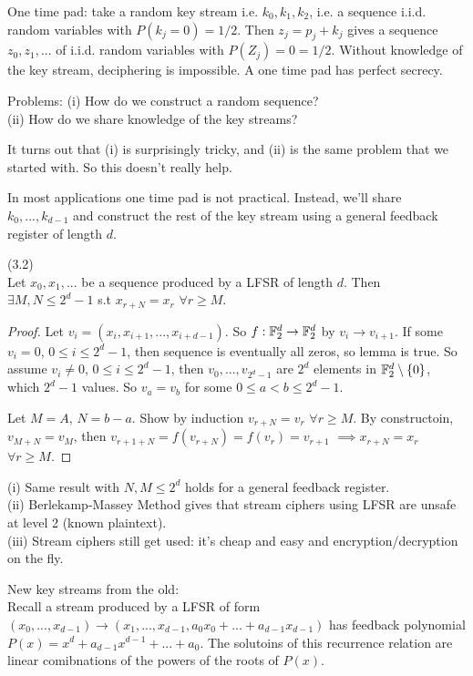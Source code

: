 \documentclass[a4paper]{article}
\begin{document}
One time pad: take a random key stream i.e. $k_0,k_1,k_2$, i.e. a sequence i.i.d. random variables with $P(k_j=0) = 1/2$. Then $z_j = p_j + k_j$ gives a sequence $z_0,z_1,...$ of i.i.d. random variables with $P(Z_j) = 0 = 1/2$. Without knowledge of the key stream, deciphering is impossible. A one time pad has perfect secrecy.

Problems: (i) How do we construct a random sequence?\\
(ii) How do we share knowledge of the key streams?

It turns out that (i) is surprisingly tricky, and (ii) is the same problem that we started with. So this doesn't really help.

In most applications one time pad is not practical. Instead, we'll share $k_0,...,k_{d-1}$ and construct the rest of the key stream using a general feedback register of length $d$.

\begin{lemma} (3.2)\\
Let $x_0,x_1,...$ be a sequence produced by a LFSR of length $d$. Then $\exists M,N \leq 2^d-1$ s.t $x_{r+N} = x_r$ $\forall r \geq M$.
\begin{proof}
Let $v_i = (x_i,x_{i+1},...,x_{i+d-1})$. So $f:\mathbb{F}_2^d \to \mathbb{F}_2^d$ by $v_i \to v_{i+1}$. If some $v_i = 0$, $0 \leq i \leq 2^d-1$, then sequence is eventually all zeros, so lemma is true. So assume $v_i \neq 0$, $0 \leq i \leq 2^d-1$, then $v_0,...,v_{2^d-1}$ are $2^d$ elements in $\mathbb{F}_2^d \setminus\{0\}$, which $2^d-1$ values. So $v_a = v_b$ for some $0 \leq a < b \leq 2^d-1$.

Let $M=A$, $N=b-a$. Show by induction $v_{r+N} = v_r$ $\forall r \geq M$. By constructoin, $v_{M+N} = v_M$, then $v_{r+1+N} = f(v_{r+N}) = f(v_r) = v_{r+1}$ $\implies x_{r+N} = x_r$ $\forall r \geq M$.
\end{proof}
\end{lemma}

\begin{rem}
(i) Same result with $N,M \leq 2^d$ holds for a general feedback register.\\
(ii) Berlekamp-Massey Method gives that stream ciphers using LFSR are unsafe at level 2 (known plaintext).\\
(iii) Stream ciphers still get used: it's cheap and easy and encryption/decryption on the fly.

New key streams from the old:\\
Recall a stream produced by a LFSR of form $(x_0,...,x_{d-1}) \to (x_1,...,x_{d-1},a_0x_0+...+a_{d-1}x_{d-1})$ has feedback polynomial $P(x) = x^d + a_{d-1} x^{d-1} + ... + a_0$. The solutoins of this recurrence relation are linear comibnations of the powers of the roots of $P(x)$.
\end{rem}
\end{document}
